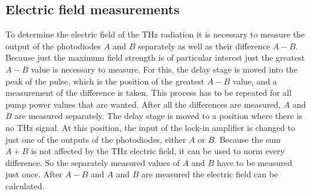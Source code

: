 \subsection{Electric field measurements}
\label{sec:field}
To determine the electric field of the $\si{\tera\hertz}$ radiation it is necessary to measure the output of the photodiodes $A$ and $B$ separately as well as their difference $A-B$.
Because just the maximum field strength is of particular interest just the greatest $A-B$ value is necessary to measure.
For this, the delay stage is moved into the peak of the pulse, which is the position of the greatest $A-B$ value, and a measurement of the difference is taken.
This process has to be repeated for all pump power values that are wanted.
After all the differences are measured, $A$ and $B$ are measured separately.
The delay stage is moved to a position where there is no $\si{\tera\hertz}$ signal.
At this position, the input of the lock-in amplifier is changed to just one of the outputs of the photodiodes, either $A$ or $B$.
Because the sum $A+B$ is not affected by the $\si{\tera\hertz}$ electric field, it can be used to norm every difference.
So the separately measured values of $A$ and $B$ have to be measured just once.
After $A-B$ and $A$ and $B$ are measured the electric field can be calculated.
